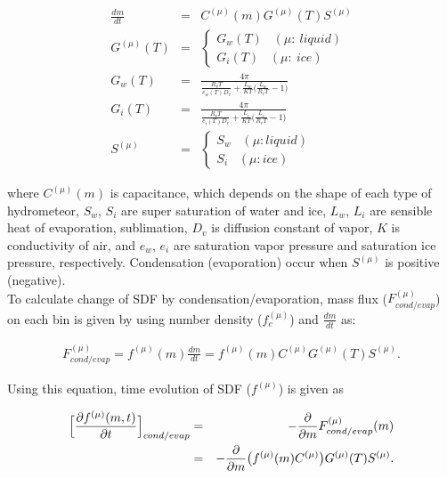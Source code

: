 \begin{eqnarray}
\frac{dm}{dt}&=&C^{(\mu)}(m)G^{(\mu)}(T)S^{(\mu)}\\
G^{(\mu)}(T)&=&
\left\{
\begin{array}{l}
G_{w}(T)\;\;\;(\mu : \:liquid)\\
G_{i}(T)\;\;\;(\mu : \:ice)
\end{array}\right. \nonumber\\
G_{w}(T)&=&\frac{4\pi}{\frac{R_{v}T}{e_{w}(T)D_{v}}+\frac{L_{w}}{KT}\bigl( \frac{L_{w}}{R_{v}T}-1\Bigr )}\nonumber\\
G_{i}(T)&=&\frac{4\pi}{\frac{R_{v}T}{e_{i}(T)D_{v}}+\frac{L_{i}}{KT}\bigl( \frac{L_{i}}{R_{v}T}-1\Bigr )}\nonumber\\
S^{(\mu)}&=&
\left\{
\begin{array}{l}
S_{w}\;\;\;(\mu : liquid)\\
S_{i}\;\;\;(\mu : ice)
\end{array}\right.\nonumber
\end{eqnarray}

where $C^{(\mu)}(m)$ is capacitance, which depends on the shape of each type of hydrometeor, $S_{w}$, $S_{i}$ are super saturation of water and ice, $L_{w}$, $L_{i}$ are sensible heat of evaporation, sublimation, $D_{v}$ is diffusion constant of vapor, $K$ is conductivity of air, and $e_{w}$, $e_{i}$ are saturation vapor pressure and saturation ice pressure, respectively. Condensation (evaporation) occur when $S^{(\mu)}$ is positive (negative).\\
To calculate change of SDF by condensation/evaporation, mass flux ($F^{(\mu)}_{cond/evap}$) on each bin is given by using number density ($f_{c}^{(\mu)}$) and $\frac{dm}{dt}$ as:

\begin{eqnarray}
F^{(\mu)}_{cond/evap}=f^{(\mu)}(m)\frac{dm}{dt}=f^{(\mu)}(m)C^{(\mu)}G^{(\mu)}(T)S^{(\mu)}.\label{s10-10}
\end{eqnarray}

Using this equation, time evolution of SDF ($f^{(\mu)}$) is given as

\begin{eqnarray}
\Bigl[\frac{\partial f^{(\mu)}(m,t)}{\partial t}\Bigr]_{cond/evap}&=&-\frac{\partial}{\partial m}F^{(\mu)}_{cond/evap}(m)\nonumber\\
&=&-\frac{\partial}{\partial m}\bigl (f^{(\mu)}(m)C^{(\mu)}\bigr ) G^{(\mu)}(T)S^{(\mu)}.\label{s10-11}
\end{eqnarray}


